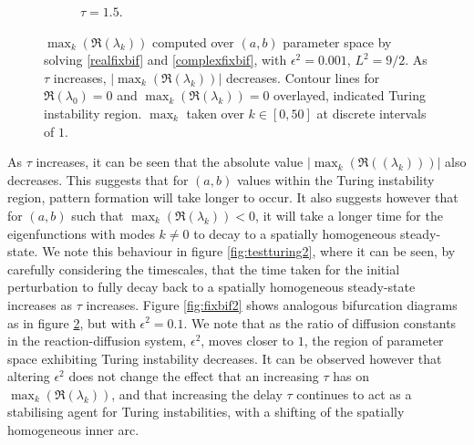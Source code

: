 \begin{figure}[H]
\begin{subfigure}[b]{0.45\textwidth}
        \caption{$\tau=1.5$.}
        \label{}
    \end{subfigure}
    \caption{$\max_k(\Re(\lambda_k))$ computed over $(a,b)$ parameter space by solving \eqref{realfixbif} and \eqref{complexfixbif}, with $\epsilon^2=0.001$, $L^2=9/2$. As $\tau$ increases, $|\max_k(\Re(\lambda_k))|$ decreases. Contour lines for $\Re(\lambda_0)=0$ and $\max_k(\Re(\lambda_k))=0$ overlayed, indicated Turing instability region. $\max_k$ taken over $k\in[0, 50]$ at discrete intervals of $1$.}
    \label{fig:lambdavary}
\end{figure}
As $\tau$ increases, it can be seen that the absolute value $|\max_k(\Re((\lambda_k)))|$ also decreases. This suggests that for $(a,b)$ values within the Turing instability region, pattern formation will take longer to occur. It also suggests however that for $(a,b)$ such that $\max_k(\Re(\lambda_k))<0$, it will take a longer time for the eigenfunctions with modes $k\neq0$ to decay to a spatially homogeneous steady-state. We note this behaviour in figure \ref{fig:testturing2}, where it can be seen, by carefully considering the timescales, that the time taken for the initial perturbation to fully decay back to a spatially homogeneous steady-state increases as $\tau$ increases. Figure \ref{fig:fixbif2} shows analogous bifurcation diagrams as in figure \ref{fig:lambdavary}, but with $\epsilon^2=0.1$. We note that as the ratio of diffusion constants in the reaction-diffusion system, $\epsilon^2$, moves closer to $1$, the region of parameter space exhibiting Turing instability decreases. It can be observed however that altering $\epsilon^2$ does not change the effect that an increasing $\tau$ has on $\max_k(\Re(\lambda_k))$, and that increasing the delay $\tau$ continues to act as a stabilising agent for Turing instabilities, with a shifting of the spatially homogeneous inner arc.

